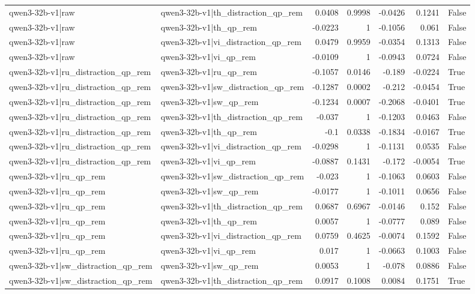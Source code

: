 \begin{table}
\begin{tabular}{l l r r r r l}
qwen3-32b-v1|raw & qwen3-32b-v1|th_distraction_qp_rem & 0.0408 & 0.9998 & -0.0426 & 0.1241 & False \\
qwen3-32b-v1|raw & qwen3-32b-v1|th_qp_rem & -0.0223 & 1 & -0.1056 & 0.061 & False \\
qwen3-32b-v1|raw & qwen3-32b-v1|vi_distraction_qp_rem & 0.0479 & 0.9959 & -0.0354 & 0.1313 & False \\
qwen3-32b-v1|raw & qwen3-32b-v1|vi_qp_rem & -0.0109 & 1 & -0.0943 & 0.0724 & False \\
qwen3-32b-v1|ru_distraction_qp_rem & qwen3-32b-v1|ru_qp_rem & -0.1057 & 0.0146 & -0.189 & -0.0224 & True \\
qwen3-32b-v1|ru_distraction_qp_rem & qwen3-32b-v1|sw_distraction_qp_rem & -0.1287 & 0.0002 & -0.212 & -0.0454 & True \\
qwen3-32b-v1|ru_distraction_qp_rem & qwen3-32b-v1|sw_qp_rem & -0.1234 & 0.0007 & -0.2068 & -0.0401 & True \\
qwen3-32b-v1|ru_distraction_qp_rem & qwen3-32b-v1|th_distraction_qp_rem & -0.037 & 1 & -0.1203 & 0.0463 & False \\
qwen3-32b-v1|ru_distraction_qp_rem & qwen3-32b-v1|th_qp_rem & -0.1 & 0.0338 & -0.1834 & -0.0167 & True \\
qwen3-32b-v1|ru_distraction_qp_rem & qwen3-32b-v1|vi_distraction_qp_rem & -0.0298 & 1 & -0.1131 & 0.0535 & False \\
qwen3-32b-v1|ru_distraction_qp_rem & qwen3-32b-v1|vi_qp_rem & -0.0887 & 0.1431 & -0.172 & -0.0054 & True \\
qwen3-32b-v1|ru_qp_rem & qwen3-32b-v1|sw_distraction_qp_rem & -0.023 & 1 & -0.1063 & 0.0603 & False \\
qwen3-32b-v1|ru_qp_rem & qwen3-32b-v1|sw_qp_rem & -0.0177 & 1 & -0.1011 & 0.0656 & False \\
qwen3-32b-v1|ru_qp_rem & qwen3-32b-v1|th_distraction_qp_rem & 0.0687 & 0.6967 & -0.0146 & 0.152 & False \\
qwen3-32b-v1|ru_qp_rem & qwen3-32b-v1|th_qp_rem & 0.0057 & 1 & -0.0777 & 0.089 & False \\
qwen3-32b-v1|ru_qp_rem & qwen3-32b-v1|vi_distraction_qp_rem & 0.0759 & 0.4625 & -0.0074 & 0.1592 & False \\
qwen3-32b-v1|ru_qp_rem & qwen3-32b-v1|vi_qp_rem & 0.017 & 1 & -0.0663 & 0.1003 & False \\
qwen3-32b-v1|sw_distraction_qp_rem & qwen3-32b-v1|sw_qp_rem & 0.0053 & 1 & -0.078 & 0.0886 & False \\
qwen3-32b-v1|sw_distraction_qp_rem & qwen3-32b-v1|th_distraction_qp_rem & 0.0917 & 0.1008 & 0.0084 & 0.1751 & True \\

\end{tabular}
\end{table}
